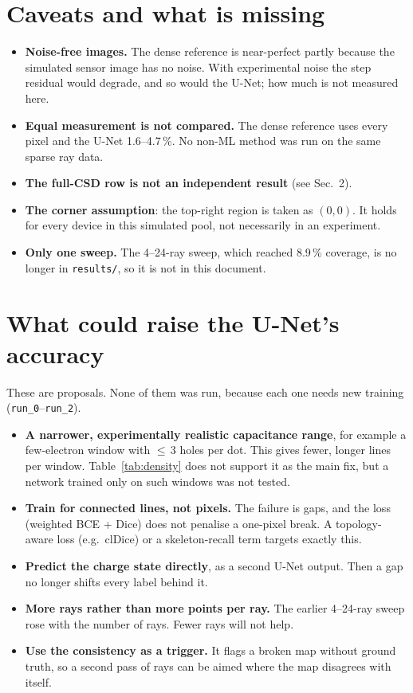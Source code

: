 \documentclass[10pt,a4paper]{article}
\begin{document}
\section{Caveats and what is missing}
\begin{itemize}
\item \textbf{Noise-free images.}  The dense reference is near-perfect
  partly because the simulated sensor image has no noise.  With
  experimental noise the step residual would degrade, and so would the
  U-Net; how much is not measured here.
\item \textbf{Equal measurement is not compared.}  The dense reference uses
  every pixel and the U-Net 1.6--4.7\,\%.  No non-ML method was run on the
  same sparse ray data.
\item \textbf{The full-CSD row is not an independent result} (see
  Sec.~2).
\item \textbf{The corner assumption}: the top-right region is taken as
  $(0,0)$.  It holds for every device in this simulated pool, not
  necessarily in an experiment.
\item \textbf{Only one sweep.}  The 4--24-ray sweep, which reached 8.9\,\%
  coverage, is no longer in \texttt{results/}, so it is not in this
  document.
\end{itemize}

\section{What could raise the U-Net's accuracy}
\label{sec:next}
These are proposals.  None of them was run, because each one needs new
training (\texttt{run\_0}--\texttt{run\_2}).
\begin{itemize}
\item \textbf{A narrower, experimentally realistic capacitance range}, for
  example a few-electron window with $\le$\,3 holes per dot.  This gives
  fewer, longer lines per window.  Table~\ref{tab:density} does not support
  it as the main fix, but a network trained only on such windows was not
  tested.
\item \textbf{Train for connected lines, not pixels.}  The failure is gaps,
  and the loss (weighted BCE + Dice) does not penalise a one-pixel break.
  A topology-aware loss (e.g.\ clDice) or a skeleton-recall term targets
  exactly this.
\item \textbf{Predict the charge state directly}, as a second U-Net output.
  Then a gap no longer shifts every label behind it.
\item \textbf{More rays rather than more points per ray.}  The earlier
  4--24-ray sweep rose with the number of rays.  Fewer rays will not help.
\item \textbf{Use the consistency as a trigger.}  It flags a broken map
  without ground truth, so a second pass of rays can be aimed where the map
  disagrees with itself.
\end{itemize}
\end{document}
